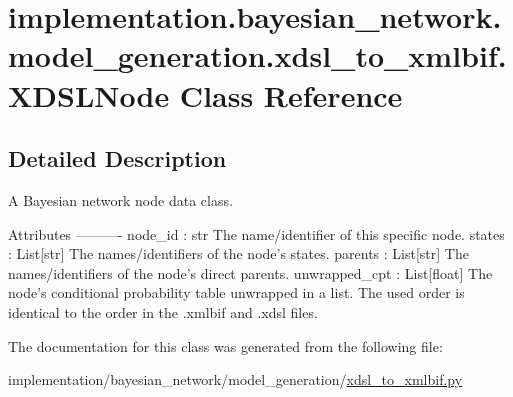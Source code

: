 \hypertarget{classimplementation_1_1bayesian__network_1_1model__generation_1_1xdsl__to__xmlbif_1_1_x_d_s_l_node}{}\section{implementation.\+bayesian\+\_\+network.\+model\+\_\+generation.\+xdsl\+\_\+to\+\_\+xmlbif.\+X\+D\+S\+L\+Node Class Reference}
\label{classimplementation_1_1bayesian__network_1_1model__generation_1_1xdsl__to__xmlbif_1_1_x_d_s_l_node}


\subsection{Detailed Description}
\begin{DoxyVerb}A Bayesian network node data class.

Attributes
----------
node_id : str
    The name/identifier of this specific node.
states : List[str]
    The names/identifiers of the node's states.
parents : List[str]
    The names/identifiers of the node's direct parents.
unwrapped_cpt : List[float]
    The node's conditional probability table unwrapped in a list. The used order is identical to the order in the
    .xmlbif and .xdsl files.
\end{DoxyVerb}
 

The documentation for this class was generated from the following file\+:\begin{DoxyCompactItemize}
\item 
implementation/bayesian\+\_\+network/model\+\_\+generation/\hyperlink{xdsl__to__xmlbif_8py}{xdsl\+\_\+to\+\_\+xmlbif.\+py}\end{DoxyCompactItemize}
